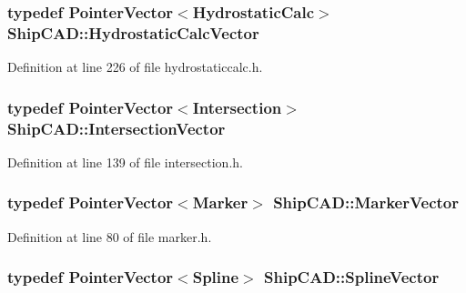 \hypertarget{namespaceShipCAD_a0c7b012d8868cbb43871cf0bf303ccc6}{
\subsubsection[{Hydrostatic\-Calc\-Vector}]{\setlength{\rightskip}{0pt plus 5cm}typedef {\bf Pointer\-Vector}$<${\bf Hydrostatic\-Calc}$>$ {\bf Ship\-C\-A\-D\-::\-Hydrostatic\-Calc\-Vector}}}\label{namespaceShipCAD_a0c7b012d8868cbb43871cf0bf303ccc6}


Definition at line 226 of file hydrostaticcalc.\-h.

\hypertarget{namespaceShipCAD_a9910f0963197f9df6125398efd4fa139}{
\subsubsection[{Intersection\-Vector}]{\setlength{\rightskip}{0pt plus 5cm}typedef {\bf Pointer\-Vector}$<${\bf Intersection}$>$ {\bf Ship\-C\-A\-D\-::\-Intersection\-Vector}}}\label{namespaceShipCAD_a9910f0963197f9df6125398efd4fa139}


Definition at line 139 of file intersection.\-h.

\hypertarget{namespaceShipCAD_a36fff5b53986f6d6976afc749463ef22}{
\subsubsection[{Marker\-Vector}]{\setlength{\rightskip}{0pt plus 5cm}typedef {\bf Pointer\-Vector}$<${\bf Marker}$>$ {\bf Ship\-C\-A\-D\-::\-Marker\-Vector}}}\label{namespaceShipCAD_a36fff5b53986f6d6976afc749463ef22}


Definition at line 80 of file marker.\-h.

\hypertarget{namespaceShipCAD_a053b941b2c87049bb9380428d4d5a056}{
\subsubsection[{Spline\-Vector}]{\setlength{\rightskip}{0pt plus 5cm}typedef {\bf Pointer\-Vector}$<${\bf Spline}$>$ {\bf Ship\-C\-A\-D\-::\-Spline\-Vector}}}\label{namespaceShipCAD_a053b941b2c87049bb9380428d4d5a056}


